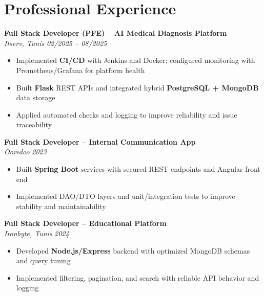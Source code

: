 \documentclass[10pt,a4paper]{article}
\begin{document}
\vspace{6pt}

\section*{Professional Experience}
{\small

\textbf{Full Stack Developer (PFE) -- AI Medical Diagnosis Platform}\\[1pt]
\textit{Itserv, Tunis} \hfill \textit{02/2025 -- 08/2025}
\begin{itemize}
  \item Implemented \textbf{CI/CD} with Jenkins and Docker; configured monitoring with Prometheus/Grafana for platform health
  \item Built \textbf{Flask} REST APIs and integrated hybrid \textbf{PostgreSQL + MongoDB} data storage
  \item Applied automated checks and logging to improve reliability and issue traceability
\end{itemize}

\vspace{3pt}
\textbf{Full Stack Developer -- Internal Communication App}\\[1pt]
\textit{Ooredoo} \hfill \textit{2023}
\begin{itemize}
  \item Built \textbf{Spring Boot} services with secured REST endpoints and Angular front end
  \item Implemented DAO/DTO layers and unit/integration tests to improve stability and maintainability
\end{itemize}

\vspace{3pt}
\textbf{Full Stack Developer -- Educational Platform}\\[1pt]
\textit{Ironbyte, Tunis} \hfill \textit{2024}
\begin{itemize}
  \item Developed \textbf{Node.js/Express} backend with optimized MongoDB schemas and query tuning
  \item Implemented filtering, pagination, and search with reliable API behavior and logging
\end{itemize}

}

\vspace{4pt}
\end{document}
